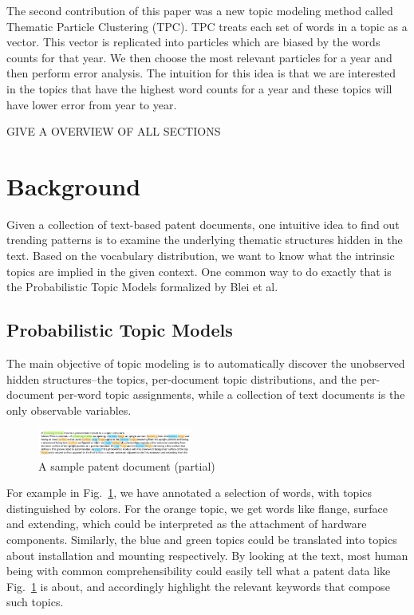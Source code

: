 \documentclass[conference]{IEEEtran}
\begin{document}
The second contribution of this paper was a new topic modeling method called Thematic Particle Clustering (TPC). TPC treats each set of words in a topic as a vector. This vector is replicated into particles which are biased by the words counts for that year. We then choose the most relevant particles for a year and then perform error analysis.   The intuition for this idea is that we are interested in the topics that have the highest word counts for a year and these topics will have lower error from year to year.

GIVE A OVERVIEW OF ALL SECTIONS

\section{Background}

Given a collection of text-based patent documents, one intuitive idea to find out trending patterns is to examine the underlying thematic structures hidden in the text. Based on the vocabulary distribution, we want to know what the intrinsic topics are implied in the given context. One common way to do exactly that is the Probabilistic Topic Models formalized by  Blei et al. \cite{blei2011}

\subsection{Probabilistic Topic Models}

The main objective of topic modeling is to automatically discover the unobserved hidden structures--the topics, per-document topic distributions, and the per-document per-word topic assignments, while a collection of text documents is the only observable variables. 

\begin{figure}[h]
	\center	
	\includegraphics[width=0.45\textwidth]{fig/pat007.png}
	\caption{A sample patent document (partial)}
	\label{sample_patent}
\end{figure}

For example in Fig.~\ref{sample_patent}, we have annotated a selection of words, with topics distinguished by colors. For the orange topic, we get words like flange, surface and extending, which could be interpreted as the attachment of hardware components. Similarly, the blue and green topics could be translated into topics about installation and mounting respectively. By looking at the text, most human being with common comprehensibility could easily tell what a patent data like Fig.~\ref{sample_patent} is about, and accordingly highlight the relevant keywords that compose such topics. 
\end{document}
